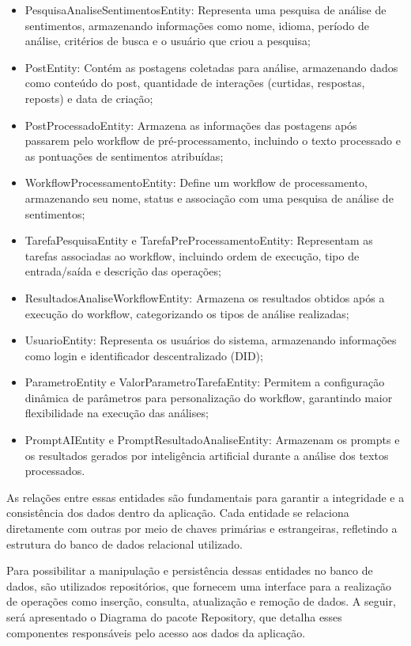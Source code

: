 \documentclass[
	12pt,				%
	oneside,			%
	a4paper,			%
	english,			%
	french,				%
	spanish,			%
	brazil				%
	]{abntex2}
\begin{document}
\begin{itemize}
\tightlist
\item
  PesquisaAnaliseSentimentosEntity: Representa uma pesquisa de análise
  de sentimentos, armazenando informações como nome, idioma, período de
  análise, critérios de busca e o usuário que criou a pesquisa;
\item
  PostEntity: Contém as postagens coletadas para análise, armazenando
  dados como conteúdo do post, quantidade de interações (curtidas,
  respostas, reposts) e data de criação;
\item
  PostProcessadoEntity: Armazena as informações das postagens após
  passarem pelo workflow de pré-processamento, incluindo o texto
  processado e as pontuações de sentimentos atribuídas;
\item
  WorkflowProcessamentoEntity: Define um workflow de processamento,
  armazenando seu nome, status e associação com uma pesquisa de análise
  de sentimentos;
\item
  TarefaPesquisaEntity e TarefaPreProcessamentoEntity: Representam as
  tarefas associadas ao workflow, incluindo ordem de execução, tipo de
  entrada/saída e descrição das operações;
\item
  ResultadosAnaliseWorkflowEntity: Armazena os resultados obtidos após a
  execução do workflow, categorizando os tipos de análise realizadas;
\item
  UsuarioEntity: Representa os usuários do sistema, armazenando
  informações como login e identificador descentralizado (DID);
\item
  ParametroEntity e ValorParametroTarefaEntity: Permitem a configuração
  dinâmica de parâmetros para personalização do workflow, garantindo
  maior flexibilidade na execução das análises;
\item
  PromptAIEntity e PromptResultadoAnaliseEntity: Armazenam os prompts e
  os resultados gerados por inteligência artificial durante a análise
  dos textos processados.
\end{itemize}

As relações entre essas entidades são fundamentais para garantir a
integridade e a consistência dos dados dentro da aplicação. Cada
entidade se relaciona diretamente com outras por meio de chaves
primárias e estrangeiras, refletindo a estrutura do banco de dados
relacional utilizado.

Para possibilitar a manipulação e persistência dessas entidades no banco
de dados, são utilizados repositórios, que fornecem uma interface para a
realização de operações como inserção, consulta, atualização e remoção
de dados. A seguir, será apresentado o Diagrama do pacote Repository,
que detalha esses componentes responsáveis pelo acesso aos dados da
aplicação.
\end{document}
